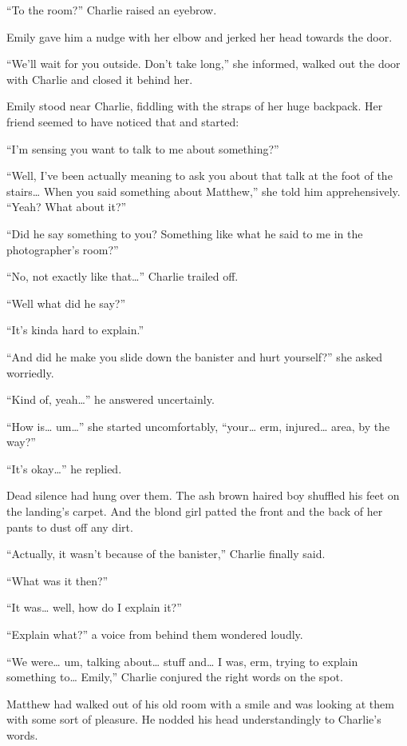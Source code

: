 “To the room?” Charlie raised an eyebrow.

Emily gave him a nudge with her elbow and jerked her head towards the door.

“We'll wait for you outside. Don't take long,” she informed, walked out the door with Charlie and closed it behind her.

\bigskip

Emily stood near Charlie, fiddling with the straps of her huge backpack. Her friend seemed to have noticed that and started:

“I'm sensing you want to talk to me about something?”

“Well, I've been actually meaning to ask you about that talk at the foot of the stairs… When you said something about Matthew,” she told him apprehensively.
“Yeah? What about it?”

“Did he say something to you? Something like what he said to me in the photographer's room?”

“No, not exactly like that…” Charlie trailed off.

“Well what did he say?”

“It's kinda hard to explain.”

“And did he make you slide down the banister and hurt yourself?” she asked worriedly.

“Kind of, yeah…” he answered uncertainly.

“How is… um…” she started uncomfortably, “your… erm, injured… area, by the way?”

“It's okay…” he replied.

Dead silence had hung over them. The ash brown haired boy shuffled his feet on the landing's carpet. And the blond girl patted the front and the back of her pants to dust off any dirt.

“Actually, it wasn't because of the banister,” Charlie finally said.

“What was it then?”

“It was… well, how do I explain it?”

“Explain what?” a voice from behind them wondered loudly.

“We were… um, talking about… stuff and… I was, erm, trying to explain something to… Emily,” Charlie conjured the right words on the spot.

Matthew had walked out of his old room with a smile and was looking at them with some sort of pleasure. He nodded his head understandingly to Charlie's words.

